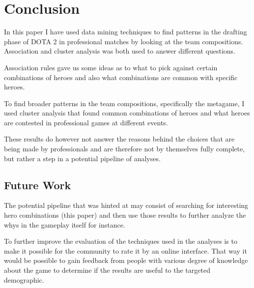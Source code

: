 \documentclass[result.tex]{subfiles}
\begin{document}
\section*{\centering Conclusion}

In this paper I have used data mining techniques to find patterns in the drafting phase of DOTA 2 in professional matches by looking at the team compositions. Association and cluster analysis was both used to answer different questions.

Association rules gave us some ideas as to what to pick against certain combinations of heroes and also what combinations are common with specific heroes.

To find broader patterns in the team compositions, specifically the metagame, I used cluster analysis that found common combinations of heroes and what heroes are contested in professional games at different events.

These results do however not answer the reasons behind the choices that are being made by professionals and are therefore not by themselves fully complete, but rather a step in a potential pipeline of analyses.

\subsection*{Future Work}

The potential pipeline that was hinted at may consist of searching for interesting hero combinations (this paper) and then use those results to further analyze the whys in the gameplay itself for instance.

To further improve the evaluation of the techniques used in the analyses is to make it possible for the community to rate it by an online interface. That way it would be possible to gain feedback from people with various degree of knowledge about the game to determine if the results are useful to the targeted demographic.
\end{document}
